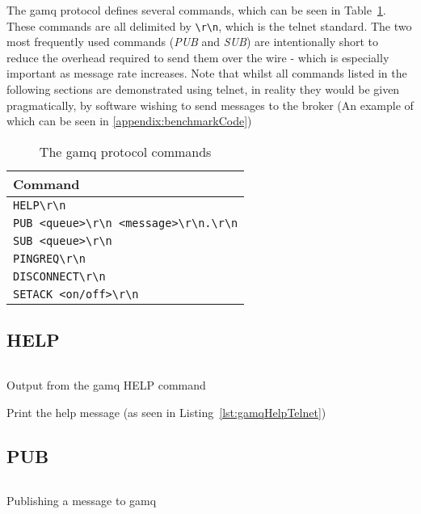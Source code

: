 The \gls{gamq} protocol defines several commands, which can be seen in
Table~\ref{tab:protocol}. These commands are all delimited by \verb|\r\n|, which
is the telnet standard. The two most frequently used commands (\emph{PUB} and
\emph{SUB}) are intentionally short to reduce the overhead required to send them
over the wire - which is especially important as message rate increases. Note
that whilst all commands listed in the following sections are demonstrated using
telnet, in reality they would be given pragmatically, by software wishing to
send messages to the broker (An example of which can be seen in
\ref{appendix:benchmarkCode})

\begin{table}[H]
\centering
\caption{The \gls{gamq} protocol commands}
\label{tab:protocol}
\begin{tabular}{|l|}
\hline
Command \\ \hline
\verb|HELP\r\n|                           \\
\verb|PUB <queue>\r\n <message>\r\n.\r\n| \\
\verb|SUB <queue>\r\n|                    \\
\verb|PINGREQ\r\n|                        \\
\verb|DISCONNECT\r\n|                     \\
\verb|SETACK <on/off>\r\n|                \\ \hline
\end{tabular}
\end{table}

\subsection{HELP}
\label{sub:helpCommand}

\begin{listing}[H]
  \centering
  \inputminted{bash}{code/gamqHelpOutputTelnet}
  \caption{Output from the \gls{gamq} HELP command}
  \label{lst:gamqHelpTelnet}
\end{listing}

Print the help message (as seen in Listing~\ref{lst:gamqHelpTelnet})

\subsection{PUB}
\label{sub:pubCommand}

\begin{listing}[H]
  \centering
  \inputminted{bash}{code/gamqPubOutput}
  \caption{Publishing a message to gamq}
  \label{lst:gamqPubTelnet}
\end{listing}

